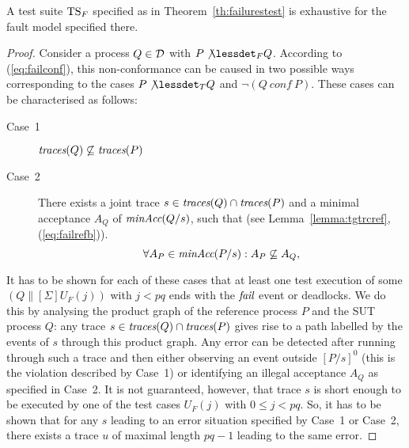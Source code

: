 %
\begin{lemma}\label{lemma:mainfexhaustive}
A test suite ${\text{TS}}_F$ specified as in Theorem~\ref{th:failurestest} is
exhaustive for the fault model specified there.
\end{lemma}
\begin{proof}
Consider a process $Q\in{\cal D}$ with $P\not\lessdet_F Q$. According to
(\ref{eq:failconf}), this non-conformance can be caused in two possible ways
corresponding to the cases $P\not\lessdet_T Q$ and $\neg(Q\ conf\ P)$. These
cases can be characterised as follows:
\begin{description}
\item[Case~1] $\text{\it traces}(Q)\not\subseteq \text{\it traces}(P)$
\item[Case~2] There exists a joint trace $s\in\text{\it traces}(Q)\cap\text{\it traces}(P)$ and a minimal acceptance $A_Q$
of $\text{\it minAcc}(Q/s)$, such that
(see Lemma~\ref{lemma:tgtrcref}, (\ref{eq:failrefb})).
\begin{equation}
\label{eq:accsnotcontained}
\forall A_P\in\text{\it minAcc}(P/s): A_P\not\subseteq A_Q,
\end{equation}
\end{description}
It has to be shown for each of these cases that at least one test execution
of some $(Q\parallel[\Sigma] U_F(j))$ with $j < pq$ ends with the ${\text{\it fail}}$
event or deadlocks. We do this by analysing the product graph of the
reference process $P$ and the SUT process $Q$: any trace
$s\in\text{\it traces}(Q)\cap\text{\it traces}(P)$ gives rise to a path labelled by the events of $s$
through this product graph. Any error can be detected after running through
such a trace and then either observing an event outside $[P/s]^0$ (this is
the violation described by Case~1) or identifying an illegal acceptance $A_Q$
as specified in Case~2. It is not guaranteed, however, that trace $s$ is
short enough to be executed by one of the test cases $U_F(j)$ with $0\le j <
pq$. So, it has to be shown that for any $s$ leading to an error situation
specified by Case~1 or Case~2, there exists a trace $u$ of maximal length
$pq-1$ leading to the same error.


\end{proof}
